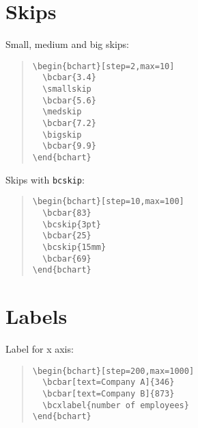 \documentclass{article}
\begin{document}
\section{Skips}

Small, medium and big skips:
\begin{quote}\small
\begin{verbatim}
\begin{bchart}[step=2,max=10]
  \bcbar{3.4}
  \smallskip
  \bcbar{5.6}
  \medskip
  \bcbar{7.2}
  \bigskip
  \bcbar{9.9}
\end{bchart}
\end{verbatim}
\end{quote}
\begin{quote}
\begin{bchart}[step=2,max=10]
  \smallskip
  \medskip
  \bigskip
\end{bchart}
\end{quote}
Skips with \texttt{bcskip}:
\begin{quote}\small
\begin{verbatim}
\begin{bchart}[step=10,max=100]
  \bcbar{83}
  \bcskip{3pt}
  \bcbar{25}
  \bcskip{15mm}
  \bcbar{69}
\end{bchart}
\end{verbatim}
\end{quote}
\begin{quote}
\begin{bchart}[step=10,max=100]
  \bcskip{3pt}
  \bcskip{15mm}
\end{bchart}
\end{quote}


\section{Labels}

Label for x axis:
\begin{quote}\small
\begin{verbatim}
\begin{bchart}[step=200,max=1000]
  \bcbar[text=Company A]{346}
  \bcbar[text=Company B]{873}
  \bcxlabel{number of employees}
\end{bchart}
\end{verbatim}
\end{quote}
\begin{quote}
\begin{bchart}[step=200,max=1000]
\end{bchart}
\end{quote}
\end{document}
